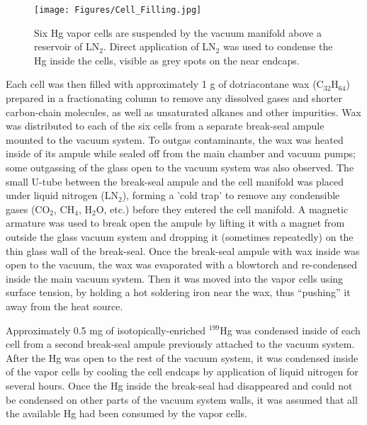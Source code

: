 \documentclass [10pt, twoside] {uwthesis}[2012/04/02]
\begin{document}
\begin{figure}
\begin{center}
\texttt{[image: Figures/Cell\_Filling.jpg]}
\end{center}
\caption[Vapor cells on vacuum manifold]%
{\narrower Six Hg vapor cells are suspended by the vacuum manifold above a reservoir of LN$_2$. Direct application of LN$_2$ was used to condense the Hg inside the cells, visible as grey spots on the near endcaps.}
\label{HgFilling}
\end{figure}

Each cell was then filled with approximately 1 g of dotriacontane wax (C$_{32}$H$_{64}$) prepared in a fractionating column to remove any dissolved gases and shorter carbon-chain molecules, as well as unsaturated alkanes and other impurities. Wax was distributed to each of the six cells from a separate break-seal ampule mounted to the vacuum system. To outgas contaminants, the wax was heated inside of its ampule while sealed off from the main chamber and vacuum pumps; some outgassing of the glass open to the vacuum system was also observed. The small U-tube between the break-seal ampule and the cell manifold was placed under liquid nitrogen (LN$_2$), forming a 'cold trap' to remove any condensible gases (CO$_2$, CH$_4$, H$_2$O, etc.) before they entered the cell manifold. A magnetic armature was used to break open the ampule by lifting it with a magnet from outside the glass vacuum system and dropping it (sometimes repeatedly) on the thin glass wall of the break-seal. Once the break-seal ampule with wax inside was open to the vacuum, the wax was evaporated with a blowtorch and re-condensed inside the main vacuum system. Then it was moved into the vapor cells using surface tension, by holding a hot soldering iron near the wax, thus ``pushing'' it away from the heat source.

Approximately 0.5 mg of isotopically-enriched $^{199}$Hg was condensed inside of each cell from a second break-seal ampule previously attached to the vacuum system. After the Hg was open to the rest of the vacuum system, it was condensed inside of the vapor cells by cooling the cell endcaps by application of liquid nitrogen for several hours. Once the Hg inside the break-seal had disappeared and could not be condensed on other parts of the vacuum system walls, it was assumed that all the available Hg had been consumed by the vapor cells. 
\end{document}
